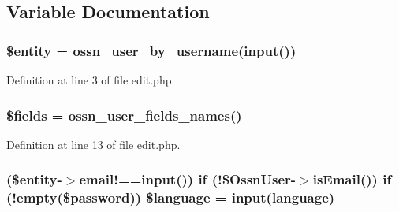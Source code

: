 \subsection{Variable Documentation}
\subsubsection[{\texorpdfstring{\$entity}{$entity}}]{\setlength{\rightskip}{0pt plus 5cm}\$entity = {\bf ossn\+\_\+user\+\_\+by\+\_\+username}({\bf input}(\textquotesingle{}))}\hypertarget{components_2_ossn_profile_2actions_2edit_8php_a74ed34e6d7bc9f3f8c4fb58a12247ee2}{}\label{components_2_ossn_profile_2actions_2edit_8php_a74ed34e6d7bc9f3f8c4fb58a12247ee2}


Definition at line 3 of file edit.\+php.

\subsubsection[{\texorpdfstring{\$fields}{$fields}}]{\setlength{\rightskip}{0pt plus 5cm}\$fields = {\bf ossn\+\_\+user\+\_\+fields\+\_\+names}()}\hypertarget{components_2_ossn_profile_2actions_2edit_8php_ab2303c817e3b402b77b7f99627b9c319}{}\label{components_2_ossn_profile_2actions_2edit_8php_ab2303c817e3b402b77b7f99627b9c319}


Definition at line 13 of file edit.\+php.

\subsubsection[{\texorpdfstring{\$language}{$language}}]{ (\$entity-\/$>$email!=={\bf input}(\textquotesingle{})) {\bf if} (!\${\bf Ossn\+User}-\/$>$is\+Email()) {\bf if} (!empty(\${\bf password})) \$language = {\bf input}(\textquotesingle{}language\textquotesingle{})}\hypertarget{components_2_ossn_profile_2actions_2edit_8php_abb0d414e1404547a863663d06d3e601f}{}\label{components_2_ossn_profile_2actions_2edit_8php_abb0d414e1404547a863663d06d3e601f}


